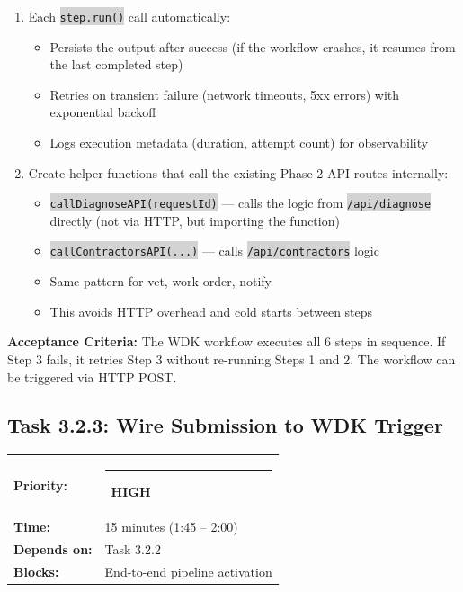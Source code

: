\documentclass[11pt, a4paper]{article}
\newcommand{\highpri}{\textcolor{highamber}{\rule{6pt}{6pt}}~\textcolor{highamber}{\scriptsize\textbf{HIGH}}}
\newcommand{\code}[1]{\texttt{\small\colorbox{lightgray}{#1}}}
\begin{document}
\begin{enumerate}[leftmargin=2em, itemsep=2pt]
\begin{lstlisting}[language=JavaScript]
  return { success: true, requestId: request.id };
});
\end{lstlisting}

  \item Each \code{step.run()} call automatically:
    \begin{itemize}[itemsep=1pt]
      \item Persists the output after success (if the workflow crashes, it resumes from the last completed step)
      \item Retries on transient failure (network timeouts, 5xx errors) with exponential backoff
      \item Logs execution metadata (duration, attempt count) for observability
    \end{itemize}

  \item Create helper functions that call the existing Phase 2 API routes internally:
    \begin{itemize}[itemsep=1pt]
      \item \code{callDiagnoseAPI(requestId)} --- calls the logic from \code{/api/diagnose} directly (not via HTTP, but importing the function)
      \item \code{callContractorsAPI(...)} --- calls \code{/api/contractors} logic
      \item Same pattern for vet, work-order, notify
      \item This avoids HTTP overhead and cold starts between steps
    \end{itemize}
\end{enumerate}

\textbf{Acceptance Criteria:} The WDK workflow executes all 6 steps in sequence. If Step 3 fails, it retries Step 3 without re-running Steps 1 and 2. The workflow can be triggered via HTTP POST.

\vspace{1em}

\subsection{Task 3.2.3: Wire Submission to WDK Trigger}

\begin{tabularx}{\textwidth}{lX}
\textbf{Priority:} & \highpri \\
\textbf{Time:} & 15 minutes (1:45 -- 2:00) \\
\textbf{Depends on:} & Task 3.2.2 \\
\textbf{Blocks:} & End-to-end pipeline activation \\
\end{tabularx}
\end{document}
